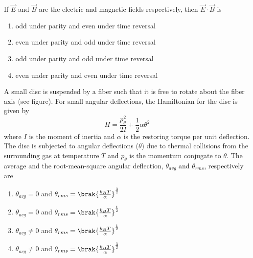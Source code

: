 \item If $\vec{E}$ and $\vec{B}$ are the electric and magnetic fields respectively, then $\vec{E}\cdot\vec{B}$ is

\begin{enumerate}
\item odd under parity and even under time reversal
\item even under parity and odd under time reversal
\item odd under parity and odd under time reversal
\item even under parity and even under time reversal
\end{enumerate}

\item A small disc is suspended by a fiber such that it is free to rotate about the fiber axis (see figure). For small angular deflections, the Hamiltonian for the disc is given by $$H=\frac{p^2_\theta}{2I}+\frac{1}{2}\alpha\theta^2$$ where $I$ is the moment of inertia and $\alpha$ is the restoring torque per unit deflection. The disc is subjected to angular deflections ($\theta$) due to thermal collisions from the surrounding gas at temperature $T$ and $p_\theta$ is the momentum conjugate to $\theta$. The average and the root-mean-square angular deflection, $\theta_{avg}$ and $\theta_{rms}$, respectively are

\vspace{0.5 cm}


\begin{enumerate}
\item $\theta_{avg}=0$ and $\theta_{rms}=\brak{\frac{k_BT}{\alpha}}^{\frac{3}{2}}$
\item $\theta_{avg}=0$ and $\theta_{rms}=\brak{\frac{k_BT}{\alpha}}^{\frac{1}{2}}$
\item $\theta_{avg}\neq0$ and $\theta_{rms}=\brak{\frac{k_BT}{\alpha}}^{\frac{1}{2}}$
\item $\theta_{avg}\neq0$ and $\theta_{rms}=\brak{\frac{k_BT}{\alpha}}^{\frac{3}{2}}$
\end{enumerate}

